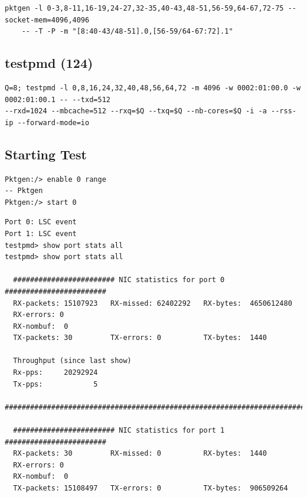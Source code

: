 \documentclass[letter]{article}
\begin{document}
{{%
\begin{lstlisting}
pktgen -l 0-3,8-11,16-19,24-27,32-35,40-43,48-51,56-59,64-67,72-75 --socket-mem=4096,4096 
	-- -T -P -m "[8:40-43/48-51].0,[56-59/64-67:72].1"
\end{lstlisting}

\subsection{testpmd (124)}

\begin{lstlisting}[escapechar=!]
Q=8; testpmd -l 0,8,16,24,32,40,48,56,64,72 -m 4096 -w 0002:01:00.0 -w 0002:01:00.1 -- --txd=512
--rxd=1024 --mbcache=512 --rxq=$Q --txq=$Q --nb-cores=$Q -i -a --rss-ip --forward-mode=io
\end{lstlisting}

\subsection{Starting Test}

\begin{lstlisting}[escapechar=!]
Pktgen:/> enable 0 range
-- Pktgen 
Pktgen:/> start 0
\end{lstlisting}

\begin{lstlisting}
Port 0: LSC event
Port 1: LSC event
testpmd> show port stats all
testpmd> show port stats all

  ######################## NIC statistics for port 0  ########################
  RX-packets: 15107923   RX-missed: 62402292   RX-bytes:  4650612480
  RX-errors: 0
  RX-nombuf:  0         
  TX-packets: 30         TX-errors: 0          TX-bytes:  1440

  Throughput (since last show)
  Rx-pps:     20292924
  Tx-pps:            5
  ############################################################################

  ######################## NIC statistics for port 1  ########################
  RX-packets: 30         RX-missed: 0          RX-bytes:  1440
  RX-errors: 0
  RX-nombuf:  0         
  TX-packets: 15108497   TX-errors: 0          TX-bytes:  906509264


\end{lstlisting}}}
\end{document}
